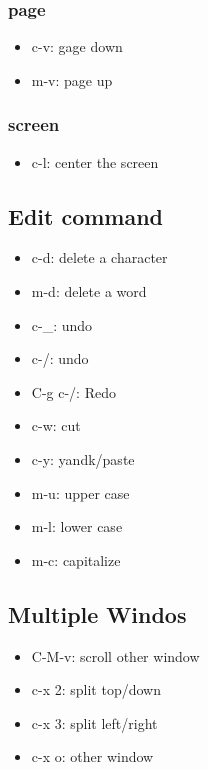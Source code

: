 \documentclass[11pt]{article}
\begin{document}
\subsubsection{page}
\label{sec:orgdf84813}
\begin{itemize}
\item c-v: gage down
\item m-v: page up
\end{itemize}
\subsubsection{screen}
\label{sec:org48b556d}
\begin{itemize}
\item c-l: center the screen
\end{itemize}

\subsection{Edit command}
\label{sec:orgdd5bda0}
\begin{itemize}
\item c-d: delete a character
\item m-d: delete a word

\item c-\_: undo
\item c-/: undo
\item C-g c-/: Redo

\item c-w: cut
\item c-y: yandk/paste

\item m-u: upper case
\item m-l: lower case
\item m-c: capitalize
\end{itemize}

\subsection{Multiple Windos}
\label{sec:org2c70ec6}
\begin{itemize}
\item C-M-v: scroll other window
\item c-x 2: split top/down
\item c-x 3: split left/right
\item c-x o: other window
\end{itemize}
\end{document}
